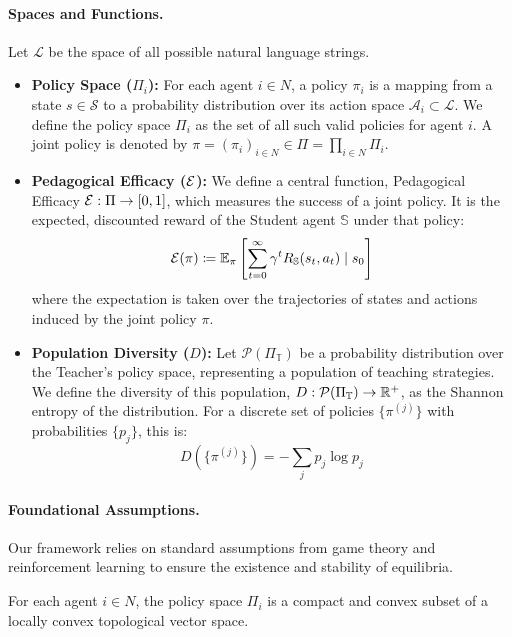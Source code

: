 \paragraph{Spaces and Functions.}
Let $\mathcal{L}$ be the space of all possible natural language strings.
\begin{itemize}
    \item \textbf{Policy Space ($\Pi_i$):} For each agent $i \in N$, a policy $\pi_i$ is a mapping from a state $s \in \mathcal{S}$ to a probability distribution over its action space $\mathcal{A}_i \subset \mathcal{L}$. We define the policy space $\Pi_i$ as the set of all such valid policies for agent $i$. A joint policy is denoted by $\pi = (\pi_i)_{i \in N} \in \Pi = \prod_{i \in N} \Pi_i$.
    
    \item \textbf{Pedagogical Efficacy ($\mathcal{E}$):} We define a central function, Pedagogical Efficacy $\mathcal{E}: \Pi \to [0, 1]$, which measures the success of a joint policy. It is the expected, discounted reward of the Student agent $\mathbb{S}$ under that policy:
    \[
    \mathcal{E}(\pi) \coloneqq \mathbb{E}_{\pi} \left[ \sum_{t=0}^{\infty} \gamma^t R_{\mathbb{S}}(s_t, a_t) \mid s_0 \right]
    \]
    where the expectation is taken over the trajectories of states and actions induced by the joint policy $\pi$.
    
    \item \textbf{Population Diversity ($D$):} Let $\mathcal{P}(\Pi_{\mathbb{T}})$ be a probability distribution over the Teacher's policy space, representing a population of teaching strategies. We define the diversity of this population, $D: \mathcal{P}(\Pi_{\mathbb{T}}) \to \mathbb{R}^+$, as the Shannon entropy of the distribution. For a discrete set of policies $\{\pi^{(j)}\}$ with probabilities $\{p_j\}$, this is:
    \[
    D(\{\pi^{(j)}\}) = -\sum_j p_j \log p_j
    \]
\end{itemize}

\paragraph{Foundational Assumptions.}
Our framework relies on standard assumptions from game theory and reinforcement learning to ensure the existence and stability of equilibria.

\begin{assumption}
\label{assump:compactness}
For each agent $i \in N$, the policy space $\Pi_i$ is a compact and convex subset of a locally convex topological vector space.
\end{assumption}

